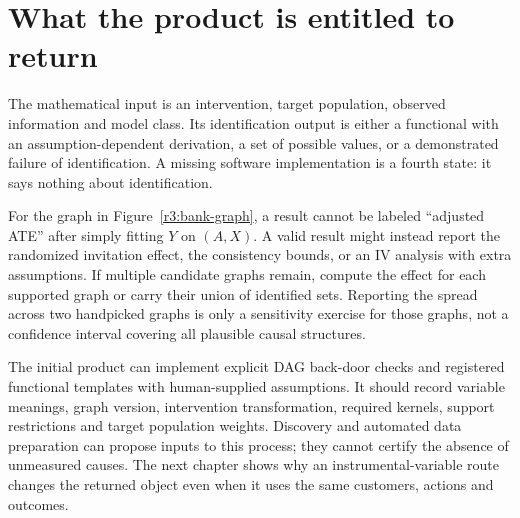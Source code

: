 \section{What the product is entitled to return}
\label{r3:graph-contract}
The mathematical input is an intervention, target population, observed
information and model class. Its identification output is either a
functional with an assumption-dependent derivation, a set of possible
values, or a demonstrated failure of identification. A missing software
implementation is a fourth state: it says nothing about identification.

For the graph in Figure~\ref{r3:bank-graph}, a result cannot be labeled
``adjusted ATE'' after simply fitting $Y$ on $(A,X)$. A valid result might
instead report the randomized invitation effect, the consistency bounds,
or an IV analysis with extra assumptions. If multiple candidate graphs
remain, compute the effect for each supported graph or carry their union
of identified sets. Reporting the spread across two handpicked graphs is
only a sensitivity exercise for those graphs, not a confidence interval
covering all plausible causal structures.

The initial product can implement explicit DAG back-door checks and
registered functional templates with human-supplied assumptions. It should
record variable meanings, graph version, intervention transformation,
required kernels, support restrictions and target population weights.
Discovery and automated data preparation can propose inputs to this
process; they cannot certify the absence of unmeasured causes. The next
chapter shows why an instrumental-variable route changes the returned
object even when it uses the same customers, actions and outcomes.
